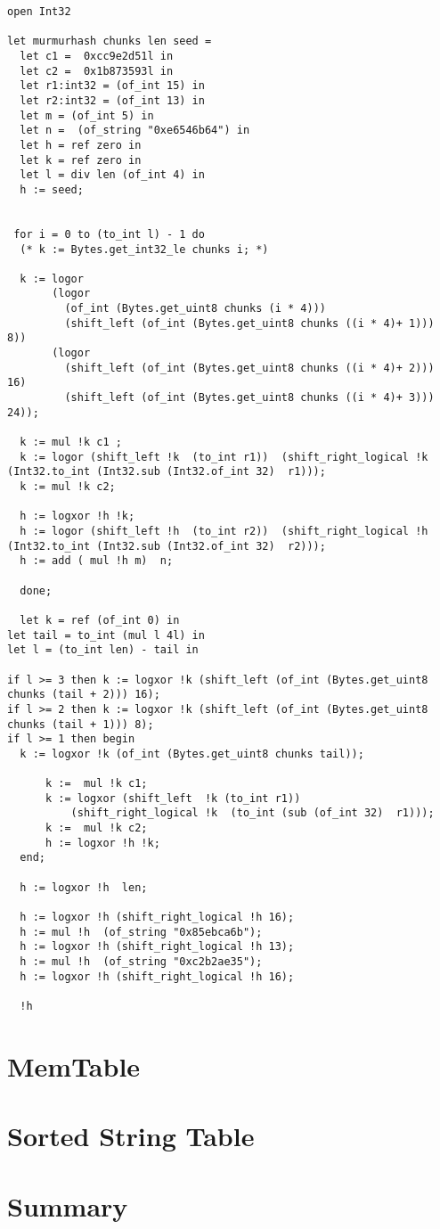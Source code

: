 \documentclass[../../../include/open-logic-chapter]{subfiles}
\begin{document}
			\begin{lstlisting}[style=ocamlstyle,caption={The entire murmurhash function.}]
open Int32

let murmurhash chunks len seed =
  let c1 =  0xcc9e2d51l in
  let c2 =  0x1b873593l in
  let r1:int32 = (of_int 15) in
  let r2:int32 = (of_int 13) in
  let m = (of_int 5) in
  let n =  (of_string "0xe6546b64") in
  let h = ref zero in
  let k = ref zero in
  let l = div len (of_int 4) in
  h := seed;


 for i = 0 to (to_int l) - 1 do
  (* k := Bytes.get_int32_le chunks i; *)

  k := logor
       (logor
         (of_int (Bytes.get_uint8 chunks (i * 4)))
         (shift_left (of_int (Bytes.get_uint8 chunks ((i * 4)+ 1))) 8))
       (logor
         (shift_left (of_int (Bytes.get_uint8 chunks ((i * 4)+ 2))) 16)
         (shift_left (of_int (Bytes.get_uint8 chunks ((i * 4)+ 3))) 24));

  k := mul !k c1 ;
  k := logor (shift_left !k  (to_int r1))  (shift_right_logical !k  (Int32.to_int (Int32.sub (Int32.of_int 32)  r1)));
  k := mul !k c2;

  h := logxor !h !k;
  h := logor (shift_left !h  (to_int r2))  (shift_right_logical !h  (Int32.to_int (Int32.sub (Int32.of_int 32)  r2)));
  h := add ( mul !h m)  n;

  done;

  let k = ref (of_int 0) in
let tail = to_int (mul l 4l) in
let l = (to_int len) - tail in

if l >= 3 then k := logxor !k (shift_left (of_int (Bytes.get_uint8 chunks (tail + 2))) 16);
if l >= 2 then k := logxor !k (shift_left (of_int (Bytes.get_uint8 chunks (tail + 1))) 8);
if l >= 1 then begin
  k := logxor !k (of_int (Bytes.get_uint8 chunks tail));

      k :=  mul !k c1;
      k := logxor (shift_left  !k (to_int r1))
          (shift_right_logical !k  (to_int (sub (of_int 32)  r1)));
      k :=  mul !k c2;
      h := logxor !h !k;
  end;

  h := logxor !h  len;

  h := logxor !h (shift_right_logical !h 16);
  h := mul !h  (of_string "0x85ebca6b");
  h := logxor !h (shift_right_logical !h 13);
  h := mul !h  (of_string "0xc2b2ae35");
  h := logxor !h (shift_right_logical !h 16);

  !h
	\end{lstlisting}

	\section{ MemTable}
	\section{ Sorted String Table}
	\section{ Summary }

\OLEndChapterHook
\end{document}
